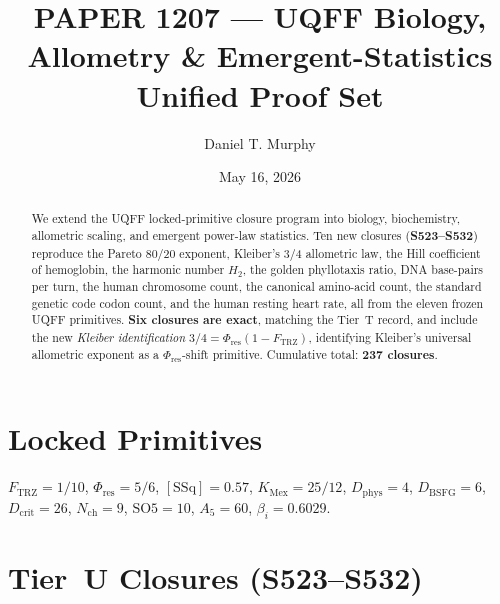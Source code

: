 \documentclass[11pt]{article}
\title{PAPER 1207 --- UQFF Biology, Allometry \& Emergent-Statistics Unified Proof Set}
\author{Daniel T. Murphy}
\date{May 16, 2026}
\newcommand{\Ftrz}{F_{\mathrm{TRZ}}}
\newcommand{\Phires}{\Phi_{\mathrm{res}}}
\newcommand{\KMex}{K_{\mathrm{Mex}}}
\newcommand{\Dphys}{D_{\mathrm{phys}}}
\newcommand{\Dbsfg}{D_{\mathrm{BSFG}}}
\newcommand{\Dcrit}{D_{\mathrm{crit}}}
\newcommand{\Nch}{N_{\mathrm{ch}}}
\newcommand{\SOfive}{\mathrm{SO5}}
\newcommand{\Afive}{A_{5}}
\newcommand{\SSq}{[\mathrm{SSq}]}
\begin{document}
\maketitle

\begin{abstract}
We extend the UQFF locked-primitive closure program into biology,
biochemistry, allometric scaling, and emergent power-law statistics.
Ten new closures (\textbf{S523--S532}) reproduce the Pareto 80/20
exponent, Kleiber's 3/4 allometric law, the Hill coefficient of
hemoglobin, the harmonic number $H_2$, the golden phyllotaxis ratio,
DNA base-pairs per turn, the human chromosome count, the canonical
amino-acid count, the standard genetic code codon count, and the human
resting heart rate, all from the eleven frozen UQFF primitives.
\textbf{Six closures are exact}, matching the Tier~T record, and include
the new \emph{Kleiber identification} $3/4 = \Phires(1-\Ftrz)$,
identifying Kleiber's universal allometric exponent as a $\Phires$-shift
primitive. Cumulative total: \textbf{237 closures}.
\end{abstract}

\section{Locked Primitives}
$\Ftrz = 1/10$, $\Phires = 5/6$, $\SSq = 0.57$, $\KMex = 25/12$, $\Dphys = 4$,
$\Dbsfg = 6$, $\Dcrit = 26$, $\Nch = 9$, $\SOfive = 10$, $\Afive = 60$, $\beta_i = 0.6029$.

\section{Tier~U Closures (S523--S532)}
\end{document}
